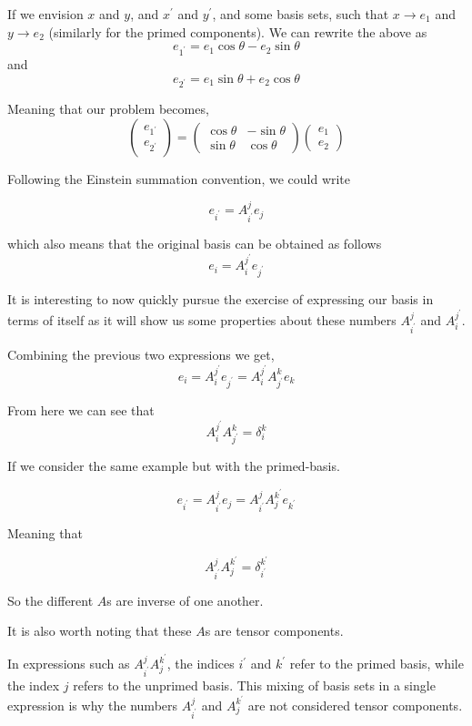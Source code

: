 If we envision $x$ and $y$, and $x^\prime$ and $y^\prime$, and some basis sets,
such that $x \rightarrow e_1$ and $y \rightarrow e_2$ (similarly for the primed components).
We can rewrite the above as
$$
e_{1^\prime} = e_1 \cos\theta - e_2 \sin\theta
$$
and
$$
e_{2^\prime} = e_1 \sin\theta + e_2 \cos\theta
$$

Meaning that our problem becomes,
$$
\begin{pmatrix}
e_{1^\prime} \\
e_{2^\prime}
\end{pmatrix}
=
\begin{pmatrix}
\cos\theta & - \sin\theta \\
\sin\theta & \cos\theta
\end{pmatrix}
\begin{pmatrix}
e_1 \\
e_2
\end{pmatrix}
$$

Following the Einstein summation convention, we could write

$$
e_{i^\prime} = A_{i^\prime}^{j} e_j
$$

which also means that the original basis can be obtained as follows
$$
e_{i} = A_{i}^{j^\prime} e_{j^\prime}
$$

It is interesting to now quickly pursue the exercise of expressing our basis in terms of itself
as it will show us some properties about these numbers $A_{i^\prime}^{j}$ and $A_{i}^{j^\prime}$.


Combining the previous two expressions we get,
$$
e_{i} = A_{i}^{j^\prime} e_{j^\prime}
= A_{i}^{j^\prime} A_{j^\prime}^{k} e_k
$$

From here we can see that
$$
A_{i}^{j^\prime} A_{j^\prime}^{k} = \delta_{i}^{k}
$$

If we consider the same example but with the primed-basis.

$$
e_{i^\prime} = A_{i^\prime}^{j} e_j 
= A_{i^\prime}^{j} A_{j}^{k^\prime} e_{k^\prime}
$$

Meaning that

$$
A_{i^\prime}^{j} A_{j}^{k^\prime} = \delta_{i^\prime}^{k^\prime}
$$

So the different $A$s are inverse of one another.

It is also worth noting that these $A$s are tensor components.


In expressions such as $A_{i^{\prime}}^{j} A_{j}^{k^{\prime}}$, the indices $i^{\prime}$ and $k^{\prime}$ refer
to the primed basis, while the index $j$ refers to the unprimed basis.
This mixing of basis sets in a single expression is why the numbers $A_{i^{\prime}}^{j}$ and $A_{j}^{k^{\prime}}$
are not considered tensor components.

